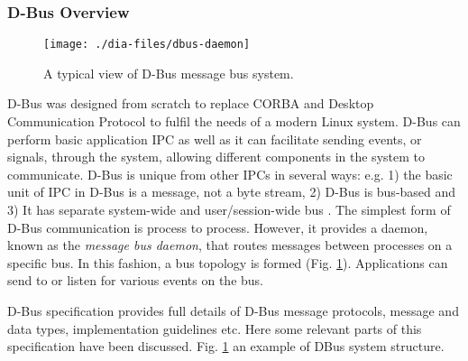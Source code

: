 \subsubsection*{D-Bus Overview}
\begin{figure}[H]
\begin{center}
\texttt{[image: ./dia-files/dbus-daemon]} 
\caption{A typical view of D-Bus message bus system. } 
\label{fig:dbus-daemon}
\end{center}
\end{figure}
D-Bus was designed from scratch to replace CORBA and Desktop Communication Protocol to fulfil the needs of a modern Linux system. D-Bus can perform basic application IPC as well as it can facilitate sending events, or signals, through the system, allowing different components in the system to communicate. D-Bus is unique from other IPCs in several ways: e.g. 1) the basic unit of IPC in D-Bus is a message, not a byte stream, 2) D-Bus is bus-based and 3) It has separate system-wide and user/session-wide bus \cite{Love2005}. The simplest form of D-Bus communication is process to process. However, it provides a daemon, known as the {\em message bus daemon}, that routes messages between processes on a specific bus. In this fashion, a bus topology is formed (Fig. \ref{fig:dbus-daemon}). Applications can send to or listen for various events on the bus.

D-Bus specification \cite{Pennington+2010} provides full details of D-Bus message protocols, message and data types, implementation guidelines etc. Here  some relevant parts of this specification have been discussed. Fig. \ref{fig:dbus-daemon} an example of DBus system structure.

